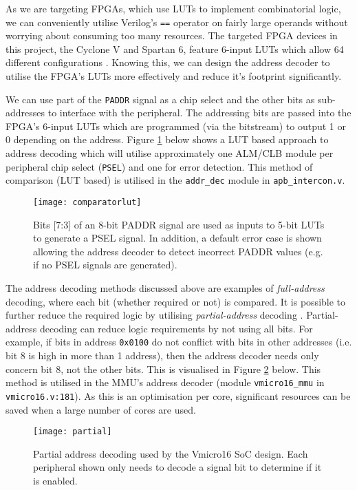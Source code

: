 As we are targeting FPGAs, which use LUTs to implement combinatorial logic, we can conveniently utilise Verilog's \verb|==| operator on fairly large operands without worrying about consuming too many resources. The targeted FPGA devices in this project, the Cyclone V and Spartan 6, feature 6-input LUTs which allow 64 different configurations \cite{s6clb, cvclb}. Knowing this, we can design the address decoder to utilise the FPGA's LUTs more effectively and reduce it's footprint significantly.

We can use part of the \verb|PADDR| signal as a chip select and the other bits as sub-addresses to interface with the peripheral. The addressing bits are passed into the FPGA's 6-input LUTs which are programmed (via the bitstream) to output 1 or 0 depending on the address. Figure \ref{fig:comparatorlut} below shows a LUT based approach to address decoding which will utilise approximately one ALM/CLB module per peripheral chip select (\verb|PSEL|) and one for error detection. This method of comparison (LUT based) is utilised in the \verb|addr_dec| module in \verb|apb_intercon.v|.

\begin{figure}[H]
\centering
\texttt{[image: comparatorlut]}
\caption{Bits [7:3] of an 8-bit PADDR signal are used as inputs to 5-bit LUTs to generate a PSEL signal. In addition, a default error case is shown allowing the address decoder to detect incorrect PADDR values (e.g. if no PSEL signals are generated).}
\label{fig:comparatorlut}
\end{figure}

The address decoding methods discussed above are examples of \textit{full-address} decoding, where each bit (whether required or not) is compared. It is possible to further reduce the required logic by utilising \textit{partial-address} decoding \cite{tanenbaum2016structured}. Partial-address decoding can reduce logic requirements by not using all bits. For example, if bits in address \verb|0x0100| do not conflict with bits in other addresses (i.e. bit 8 is high in more than 1 address), then the address decoder needs only concern bit 8, not the other bits. This is visualised in Figure \ref{fig:partial} below. This method is utilised in the MMU's address decoder (module \verb|vmicro16_mmu| in \verb|vmicro16.v:181|). As this is an optimisation per core, significant resources can be saved when a large number of cores are used.

\begin{figure}[H]
\centering
\texttt{[image: partial]}
\caption{Partial address decoding used by the Vmicro16 SoC design. Each peripheral shown only needs to decode a signal bit to determine if it is enabled.}
\label{fig:partial}
\end{figure}

